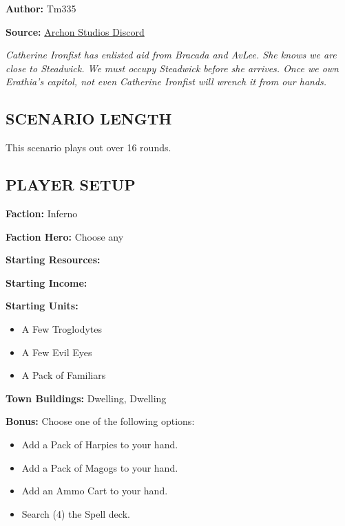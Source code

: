 
\begin{multicols*}{2}

\textbf{Author:} Tm335

\textbf{Source:} \href{https://discord.com/channels/740870068178649108/1246353361456861276/1246353361456861276}{Archon Studios Discord}

\textit{Catherine Ironfist has enlisted aid from Bracada and AvLee. 
  She knows we are close to Steadwick. We must occupy Steadwick before she arrives.
  Once we own Erathia's capitol, not even Catherine Ironfist will wrench it from our hands.}

\subsection*{\MakeUppercase{Scenario length}}

This scenario plays out over 16 rounds.

\subsection*{\MakeUppercase{Player setup}}

\textbf{Faction:} Inferno

\textbf{Faction Hero:} Choose any   

\textbf{Starting Resources:}\par
{}

\textbf{Starting Income:}\par
{}

\textbf{Starting Units:}

\begin{itemize}
  \item A Few Troglodytes
  \item A Few Evil Eyes
  \item A Pack of Familiars
\end{itemize}

\textbf{Town Buildings:}  Dwelling,  Dwelling

\vspace*{\fill}\columnbreak

\textbf{Bonus:} Choose one of the following options: 
\begin{itemize}
  \item Add a Pack of Harpies to your hand.
  \item Add a Pack of Magogs to your hand.
  \item Add an Ammo Cart to your hand.
  \item Search (4) the Spell deck.
\end{itemize}


\end{multicols*}
